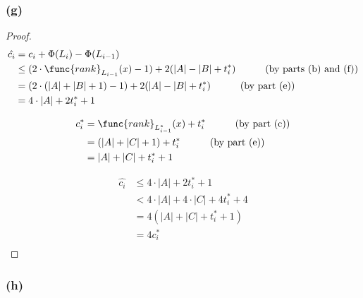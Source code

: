 \subsubsection*{(g)}

\begin{proof}
    \begin{equation*}
    \begin{split}
        \hat{c_i} & = c_i + \Phi(L_i) - \Phi(L_{i - 1}) \\
        & \leq (2 \cdot \func{rank}_{L_{i-1}}(x) - 1) + 2 (|A| - |B| + t_i^*) 
        \text{\quad\quad\quad(by parts (b) and (f))} \\
        & = (2 \cdot (|A| + |B| + 1) - 1) + 2 (|A| - |B| + t_i^*) 
        \text{\quad\quad\quad(by part (e))} \\
        & = 4 \cdot |A| + 2t_i^* + 1 \\
    \end{split}
    \end{equation*}
    
    \begin{equation*}
    \begin{split}
        c_i^* & = \func{rank}_{L_{i-1}^*}(x) + t_i^* 
        \text{\quad\quad\quad(by part (c))} \\
        & = (|A| + |C| + 1) + t_i^*
        \text{\quad\quad\quad(by part (e))} \\
        & = |A| + |C| + t_i^* + 1 \\
    \end{split}
    \end{equation*}
    
    \begin{equation*}
    \begin{split}
        \hat{c_i} & \leq 4 \cdot |A| + 2t_i^* + 1 \\
        & < 4 \cdot |A| + 4 \cdot |C| + 4t_i^* + 4 \\
        & = 4(|A| + |C| + t_i^* + 1) \\
        & = 4 c_i^* \\
    \end{split}
    \end{equation*}
\end{proof}

\subsubsection*{(h)}

